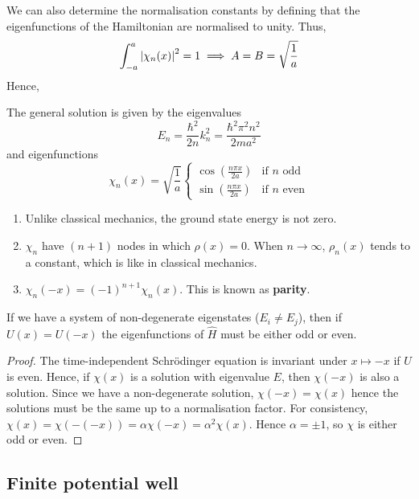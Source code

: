 \documentclass[a4paper]{article}
\begin{document}
We can also determine the normalisation constants by defining that the eigenfunctions of the Hamiltonian are normalised to unity.
Thus,
\[
	\int_{-a}^a \abs{\chi_n(x)}^2 = 1 \implies A = B = \sqrt{\frac{1}{a}}
\]
Hence, 
\begin{proposition}
    The general solution is given by the eigenvalues
    \[
        E_n = \frac{\hbar^2}{2n} k_n^2 = \frac{\hbar^2 \pi^2 n^2}{2ma^2}
    \]
    and eigenfunctions
    \[
        \chi_n(x) = \sqrt{\frac{1}{a}} \begin{cases}
            \cos(\frac{n \pi x}{2a}) & \text{if } n \text{ odd}  \\
            \sin(\frac{n \pi x}{2a}) & \text{if } n \text{ even}
        \end{cases}
    \]
\end{proposition}
\begin{remark}
	\begin{enumerate}
        \item Unlike classical mechanics, the ground state energy is not zero.
        \item\( \chi_n \) have \( (n+1) \) nodes in which \( \rho(x) = 0 \).
        When \( n \to \infty \), \( \rho_n(x) \) tends to a constant, which is like in classical mechanics.
        \item $\chi_n(-x)=(-1)^{n+1} \chi_n(x) .$
            This is known as \textbf{parity}.
    \end{enumerate}
\end{remark}
\begin{proposition}
	If we have a system of non-degenerate eigenstates (\( E_i \neq E_j \)),  then if \( U(x) = U(-x) \) the eigenfunctions of \( \hat H \) must be either odd or even.
\end{proposition}
\begin{proof}
	The time-independent Schr\"odinger equation is invariant under \( x \mapsto -x \) if \( U \) is even.
	Hence, if \( \chi(x) \) is a solution with eigenvalue \( E \), then \( \chi(-x) \) is also a solution.
	Since we have a non-degenerate solution, \( \chi(-x) = \chi(x) \) hence the solutions must be the same up to a normalisation factor.
	For consistency, \( \chi(x) = \chi(-(-x)) = \alpha \chi(-x) = \alpha^2 \chi(x) \).
	Hence \( \alpha = \pm 1 \), so \( \chi \) is either odd or even.
\end{proof}

\subsection{Finite potential well}
\end{document}
